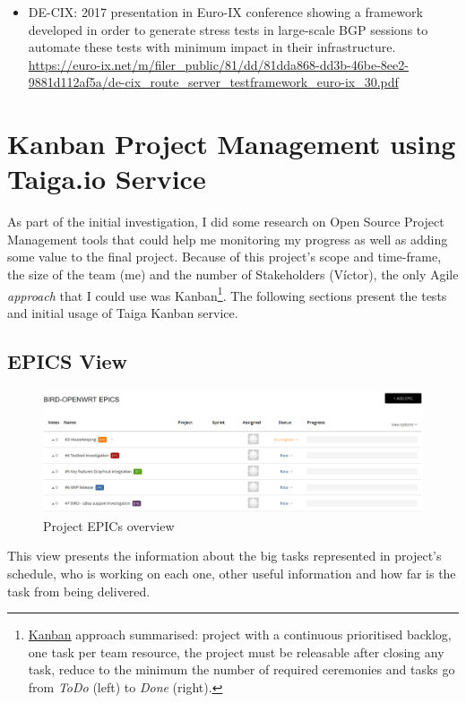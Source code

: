 \begin{appendices}
\begin{itemize}
    \item DE-CIX: 2017 presentation in Euro-IX conference showing a framework developed in order to generate stress tests in large-scale BGP sessions to automate these tests with minimum impact in their infrastructure. \url{https://euro-ix.net/m/filer_public/81/dd/81dda868-dd3b-46be-8ee2-9881d112af5a/de-cix_route_server_testframework_euro-ix_30.pdf}
\end{itemize}


\chapter{Kanban Project Management using Taiga.io Service}
\label{app:sec:kanban}
As part of the initial investigation, I did some research on Open Source Project Management tools that could help me monitoring my progress as well as adding some value to the final project.
Because of this project's scope and time-frame, the size of the team (me) and the number of Stakeholders (Víctor), the only Agile \textit{approach} that I could use was Kanban\footnote{\href{http://www.scrumhub.com/kanban-fundamentals/}{Kanban} approach summarised: project with a continuous prioritised backlog, one task per team resource, the project must be releasable after closing any task, reduce to the minimum the number of required ceremonies and tasks go from \textit{ToDo} (left) to \textit{Done} (right).}. The following sections present the tests and initial usage of Taiga Kanban service.

\begin{landscape}
\section{EPICS View}
\begin{figure}[h!]
\centering
    \includegraphics[width=\hsize]{images/kanban/epics}
    \caption{Project EPICs overview}
    \label{fig:kepic}
\end{figure}

This view presents the information about the big tasks represented in project's schedule, who is working on each one, other useful information and how far is the task from being delivered.
\newpage


\end{landscape}
\end{appendices}

